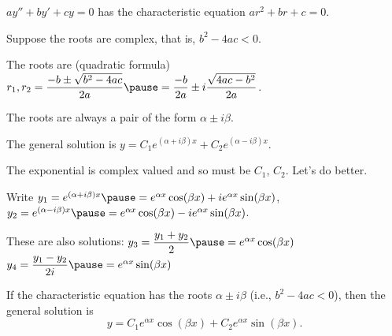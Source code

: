 \documentclass[10pt,aspectratio=169]{beamer}
\begin{document}
\begin{frame}
$ay'' + by' + cy = 0$ has the characteristic equation $a r^2 + b r + c = 0$.

\medskip
\pause

Suppose the roots are complex, that is, $b^2 - 4ac < 0$.

\medskip
\pause

The roots are (quadratic formula)
\quad
$r_1,r_2
=
\dfrac{-b \pm \sqrt{b^2 - 4ac}}{2a}
\pause
=
\dfrac{-b}{2a} \pm i\dfrac{\sqrt{4ac - b^2}}{2a}$.

\medskip
\pause

The roots are always a pair of the form $\alpha \pm i \beta$.

\medskip
\pause

The general solution is
\quad
$y = C_1 e^{(\alpha+i\beta)x} + C_2 e^{(\alpha-i\beta)x}$.

\medskip
\pause

The exponential is complex valued and so must be $C_1$, $C_2$.
Let's do better.

\medskip
\pause

Write
\quad
$y_1
= e^{(\alpha+i\beta)x}
\pause
=
e^{\alpha x} \cos (\beta x) + i e^{\alpha x} \sin (\beta x)$,
\quad
$y_2
= e^{(\alpha-i\beta)x}
\pause
=
e^{\alpha x} \cos (\beta x) - i e^{\alpha x} \sin (\beta x)$.

\medskip
\pause

These are also solutions:
\quad
$y_3 = \dfrac{y_1 + y_2}{2}
\pause 
= e^{\alpha x} \cos (\beta x)$
\quad
$y_4  = \dfrac{y_1 - y_2}{2i}
\pause
= e^{\alpha x} \sin (\beta x)$

\pause
\begin{theorem}
If the characteristic equation has the roots $\alpha \pm i \beta$
(i.e., $b^2 - 4ac < 0$),
then the general solution is
\[
y = C_1 e^{\alpha x} \cos (\beta x) + C_2 e^{\alpha x} \sin (\beta x) .
\]
\end{theorem}
\end{frame}
\end{document}
